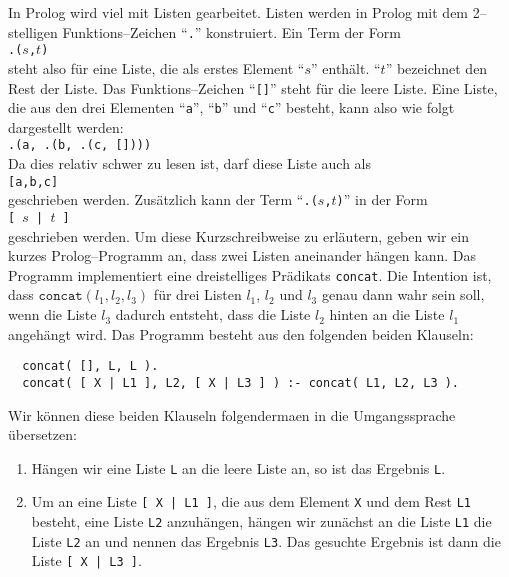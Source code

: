 In Prolog wird viel mit Listen gearbeitet.  Listen werden in Prolog mit dem
2--stelligen Funktions--Zeichen ``\texttt{.}'' konstruiert.  Ein Term der Form \\[0.1cm]
\hspace*{1.3cm} \texttt{.($s$,$t$)} \\[0.1cm]
steht also f\"{u}r eine Liste, die als erstes Element ``$s$'' enth\"{a}lt. ``$t$'' bezeichnet den
Rest der Liste.
Das Funktions--Zeichen ``\texttt{[]}'' steht
f\"{u}r die leere Liste. Eine Liste, die aus  den drei Elementen 
``\texttt{a}'', ``\texttt{b}'' und ``\texttt{c}'' besteht, kann also wie folgt dargestellt
werden: \\[0.1cm]
\hspace*{1.3cm} \texttt{.(a, .(b, .(c, [])))} \\[0.1cm]
Da dies relativ schwer zu lesen ist, darf diese Liste auch als \\[0.1cm]
\hspace*{1.3cm} \texttt{[a,b,c]} \\[0.1cm]
geschrieben werden.  Zus\"{a}tzlich kann der Term ``\texttt{.($s$,$t$)}'' in der Form \\[0.1cm]
\hspace*{1.3cm} \texttt{[ $s$ | $t$ ]} \\[0.1cm]
geschrieben werden.  Um diese Kurzschreibweise zu erl\"{a}utern, geben wir ein kurzes
Prolog--Programm an, dass zwei Listen aneinander h\"{a}ngen kann.  
Das Programm implementiert eine dreistelliges Pr\"{a}dikats \texttt{concat}.  Die Intention ist,
dass $\mathtt{concat}(l_1,l_2,l_3)$ f\"{u}r drei Listen $l_1$, $l_2$ und $l_3$ genau dann
wahr sein soll,
wenn die Liste $l_3$ dadurch entsteht, dass die Liste $l_2$ hinten an die Liste $l_1$
angeh\"{a}ngt wird.  Das Programm besteht aus den folgenden beiden Klauseln:
\begin{verbatim}
  concat( [], L, L ).
  concat( [ X | L1 ], L2, [ X | L3 ] ) :- concat( L1, L2, L3 ).
\end{verbatim}
Wir k\"{o}nnen diese beiden Klauseln folgenderma\3en in die Umgangssprache \"{u}bersetzen:
\begin{enumerate}
\item H\"{a}ngen wir eine Liste \texttt{L} an die leere Liste an, so ist das Ergebnis \texttt{L}.
\item Um an eine Liste \texttt{[ X | L1 ]}, die aus dem Element \texttt{X} und dem Rest \texttt{L1} besteht,
      eine Liste \texttt{L2} anzuh\"{a}ngen, h\"{a}ngen wir zun\"{a}chst an die Liste \texttt{L1} die 
      Liste \texttt{L2} an und nennen das Ergebnis \texttt{L3}.  
      Das gesuchte Ergebnis ist dann die Liste \texttt{[ X | L3 ]}.
\end{enumerate}
